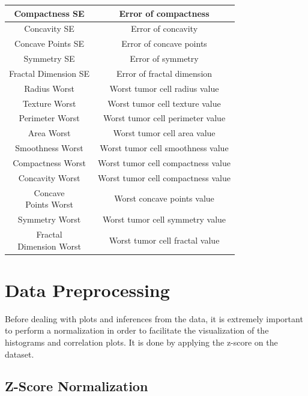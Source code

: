 \documentclass[conference]{IEEEtran}
\begin{document}
\begin{table}[htbp]
\begin{center}
\begin{tabular}{|c|c|}
    \hline
    Compactness SE & Error of compactness \\
    \hline
    Concavity SE & Error of concavity \\
    \hline
    Concave Points SE & Error of concave points \\
    \hline
    Symmetry SE & Error of symmetry \\
    \hline
    Fractal Dimension SE & Error of fractal dimension \\
    \hline
    Radius Worst & Worst tumor cell radius value \\
    \hline
    Texture Worst & Worst tumor cell texture value \\
    \hline
    Perimeter Worst &  Worst tumor cell perimeter value\\
    \hline
    Area Worst &  Worst tumor cell area value \\
    \hline
    Smoothness Worst & Worst tumor cell smoothness value \\
    \hline
    Compactness Worst &  Worst tumor cell compactness value \\
    \hline
    Concavity Worst & Worst tumor cell compactness value \\
    \hline
    \makecell{Concave \\ Points Worst} & Worst concave points value \\
    \hline
    Symmetry Worst & Worst tumor cell symmetry value \\
    \hline
    \makecell{Fractal \\ Dimension Worst} & Worst tumor cell fractal value \\
    \hline
\end{tabular}
\label{tab:Summary}
\end{center}
\end{table}


\section{Data Preprocessing}
Before dealing with plots and inferences from the data, it is extremely important to 
perform a normalization in order to facilitate the visualization of the histograms 
and correlation plots. It is done by applying the z-score on the dataset.

\subsection{Z-Score Normalization}
\end{document}
